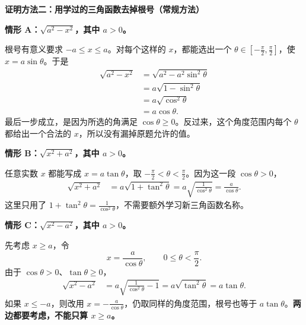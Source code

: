 \begin{proofbox}
\textbf{\textcolor{CProof}{证明方法二：用学过的三角函数去掉根号（常规方法）}}
\begin{center}\end{center}


  \textbf{情形 A：$\sqrt{a^2-x^2}$，其中 $a>0$。}

  根号有意义要求 $-a\le x\le a$。对每个这样的 $x$，都能选出一个 $\theta\in[-\frac{\pi}{2},\frac{\pi}{2}]$，使 $x=a\sin\theta$。于是
  \[
    \begin{aligned}
      \sqrt{a^2-x^2}
        &=\sqrt{a^2-a^2\sin^2\theta}\\
        &=a\sqrt{1-\sin^2\theta}\\
        &=a\sqrt{\cos^2\theta}\\
        &=a\cos\theta.
    \end{aligned}
  \]
  最后一步成立，是因为所选的角满足 $\cos\theta\ge0$。反过来，这个角度范围内每个 $\theta$ 都给出一个合法的 $x$，所以没有漏掉原题允许的值。

  \begin{center}\end{center}
\textbf{情形 B：$\sqrt{x^2+a^2}$，其中 $a>0$。}

  任意实数 $x$ 都能写成 $x=a\tan\theta$，取 $-\frac{\pi}{2}<\theta<\frac{\pi}{2}$。因为这一段 $\cos\theta>0$，
  \[
    \begin{aligned}
      \sqrt{x^2+a^2}
        &=a\sqrt{1+\tan^2\theta}
         =a\sqrt{\frac{1}{\cos^2\theta}}
         =\frac{a}{\cos\theta}.
    \end{aligned}
  \]
  这里只用了 $1+\tan^2\theta=\frac1{\cos^2\theta}$，不需要额外学习新三角函数名称。

  \textbf{情形 C：$\sqrt{x^2-a^2}$，其中 $a>0$。}

  先考虑 $x\ge a$，令
  \[
    x=\frac{a}{\cos\theta},\qquad 0\le\theta<\frac{\pi}{2}.
  \]
  由于 $\cos\theta>0$、$\tan\theta\ge0$，
  \[
    \begin{aligned}
      \sqrt{x^2-a^2}
        &=a\sqrt{\frac{1}{\cos^2\theta}-1}
         =a\sqrt{\tan^2\theta}
         =a\tan\theta.
    \end{aligned}
  \]
  如果 $x\le-a$，则改用 $x=-\frac{a}{\cos\theta}$，仍取同样的角度范围，根号也等于 $a\tan\theta$。\textbf{两边都要考虑，不能只算 $x\ge a$。}

  \medskip
  \end{proofbox}
\clearpage
